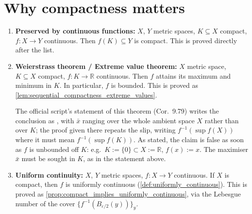 
\section{Why compactness matters}
\label{sec:why_compactness_matters}

\begin{enumerate}[label=\textbf{(\alph*)}]
  \item \label{item:continuity_preserves_compact}
    \textbf{Preserved by continuous functions:} $X$, $Y$ metric spaces, $K \subseteq X$
    compact, $f : X \to Y$ continuous. Then $f(K) \subseteq Y$ is compact. This is proved
    directly after the list.
  \item \label{item:extreme_value_theorem}
    \textbf{Weierstrass theorem / Extreme value theorem:} $X$ metric space,
    $K \subseteq X$ compact, $f : K \to \mathbb{R}$ continuous. Then $f$ attains its maximum and
    minimum in $K$. In particular, $f$ is bounded. This is proved as
    \cref{lem:sequential_compactness_extreme_values}.
    \begin{ainote}
    The official script's statement of this theorem (Cor.\ 9.79) writes the conclusion as
    , with $\bar x$ ranging over
    the whole ambient space $X$ rather than over $K$; the proof given there repeats the slip,
    writing $f^{-1}(\sup f(X))$ where it must mean $f^{-1}(\sup f(K))$. As stated, the claim is
    false as soon as $f$ is unbounded off $K$: e.g.\ $K:=\{0\}\subset X:=\mathbb{R}$,
    $f(x):=x$. The maximiser $\bar x$ must be sought in $K$, as in the statement above.
    \end{ainote}
  \item \label{item:uniform_continuity_compact}
    \textbf{Uniform continuity:} $X$, $Y$ metric spaces, $f : X \to Y$ continuous. If $X$ is
    compact, then $f$ is uniformly continuous (\cref{def:uniformly_continuous}). This is proved
    as \cref{prop:compact_implies_uniformly_continuous}, via the Lebesgue number of the cover
    $\{f^{-1}(B_{\varepsilon/2}(y))\}_{y}$.
\end{enumerate}

